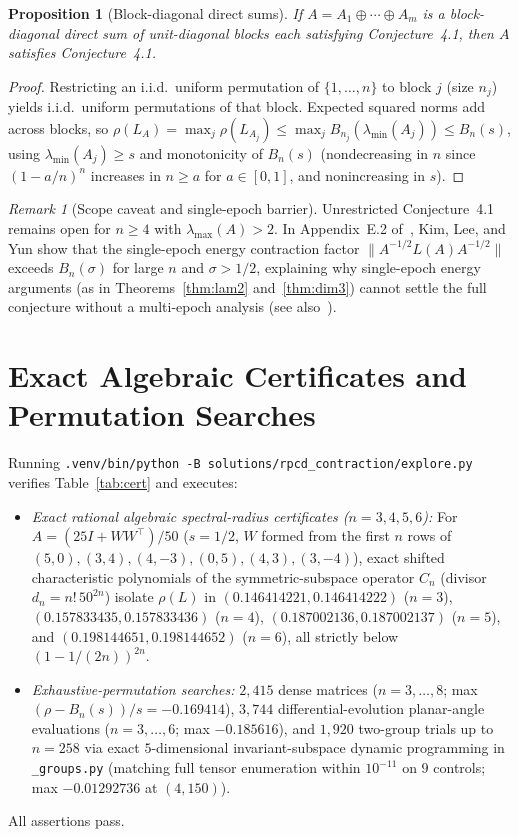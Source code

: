 \documentclass[11pt]{article}
\theoremstyle{plain}
\newtheorem{proposition}[theorem]{Proposition}
\theoremstyle{definition}
\theoremstyle{remark}
\newtheorem{remark}{Remark}
\begin{document}
\begin{proposition}[Block-diagonal direct sums]\label{prop:blocks}
If $A = A_1 \oplus \cdots \oplus A_m$ is a block-diagonal direct sum of unit-diagonal blocks each satisfying Conjecture~4.1, then $A$ satisfies Conjecture~4.1.
\end{proposition}

\begin{proof}
Restricting an i.i.d.\ uniform permutation of $\{1, \dots, n\}$ to block $j$ (size $n_j$) yields i.i.d.\ uniform permutations of that block.
Expected squared norms add across blocks, so $\rho(L_A) = \max_j \rho(L_{A_j}) \le \max_j B_{n_j}(\lambda_{\min}(A_j)) \le B_n(s)$, using $\lambda_{\min}(A_j) \ge s$ and monotonicity of $B_n(s)$ (nondecreasing in $n$ since $(1 - a/n)^n$ increases in $n \ge a$ for $a \in [0, 1]$, and nonincreasing in $s$).
\end{proof}

\begin{remark}[Scope caveat and single-epoch barrier]
Unrestricted Conjecture~4.1 remains open for $n \ge 4$ with $\lambda_{\max}(A) > 2$.
In Appendix~E.2 of~\cite{KimLeeYun2025}, Kim, Lee, and Yun show that the single-epoch energy contraction factor $\|A^{-1/2} L(A) A^{-1/2}\|$ exceeds $B_n(\sigma)$ for large $n$ and $\sigma > 1/2$, explaining why single-epoch energy arguments (as in Theorems~\ref{thm:lam2} and~\ref{thm:dim3}) cannot settle the full conjecture without a multi-epoch analysis (see also~\cite{LeeWright2019,SunLuoYe2020,WrightLee2020}).
\end{remark}

\section{Exact Algebraic Certificates and Permutation Searches}

Running \texttt{.venv/bin/python -B solutions/rpcd\_contraction/explore.py} verifies Table~\ref{tab:cert} and executes:
\begin{itemize}[leftmargin=1.5em,itemsep=2pt]
\item \emph{Exact rational algebraic spectral-radius certificates ($n = 3, 4, 5, 6$):} For $A = (25I + WW^\top)/50$ ($s = 1/2$, $W$ formed from the first $n$ rows of $(5,0),(3,4),(4,-3),(0,5),(4,3),(3,-4)$), exact shifted characteristic polynomials of the symmetric-subspace operator $C_n$ (divisor $d_n = n!\,50^{2n}$) isolate $\rho(L)$ in $(0.146414221, 0.146414222)$ ($n = 3$), $(0.157833435, 0.157833436)$ ($n = 4$), $(0.187002136, 0.187002137)$ ($n = 5$), and $(0.198144651, 0.198144652)$ ($n = 6$), all strictly below $(1 - 1/(2n))^{2n}$.
\item \emph{Exhaustive-permutation searches:} $2{,}415$ dense matrices ($n = 3, \dots, 8$; max $(\rho - B_n(s))/s = -0.169414$), $3{,}744$ differential-evolution planar-angle evaluations ($n = 3, \dots, 6$; max $-0.185616$), and $1{,}920$ two-group trials up to $n = 258$ via exact $5$-dimensional invariant-subspace dynamic programming in \texttt{\_groups.py} (matching full tensor enumeration within $10^{-11}$ on $9$ controls; max $-0.01292736$ at $(4, 150)$).
\end{itemize}
All assertions pass.
\end{document}
